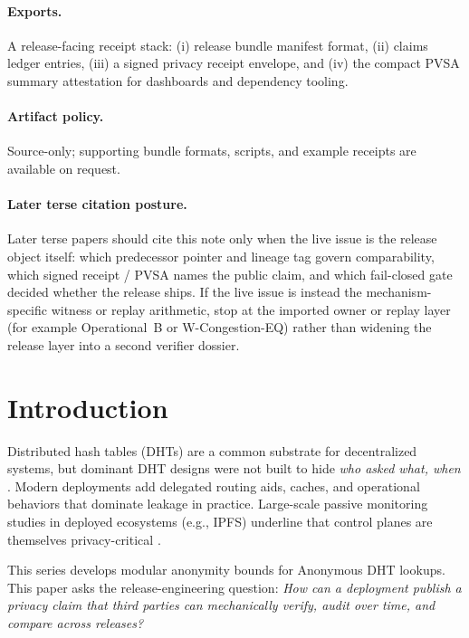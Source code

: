 \documentclass[11pt]{article}
\begin{document}
\paragraph{Exports.}
A release-facing receipt stack: (i) release bundle manifest format, (ii) claims ledger entries,
(iii) a signed privacy receipt envelope, and (iv) the compact PVSA summary attestation for dashboards and dependency tooling.

\paragraph{Artifact policy.}
Source-only; supporting bundle formats, scripts, and example receipts are available on request.\cite{series:artifactpolicy}

\paragraph{Later terse citation posture.} Later terse papers should cite this note only when the live issue is the release object itself: which predecessor pointer and lineage tag govern comparability, which signed receipt / PVSA names the public claim, and which fail-closed gate decided whether the release ships. If the live issue is instead the mechanism-specific witness or replay arithmetic, stop at the imported owner or replay layer (for example Operational~B or W-Congestion-EQ) rather than widening the release layer into a second verifier dossier.\cite{series:proofcarryingbudgets,series:wcongeq}

\section{Introduction}
Distributed hash tables (DHTs) are a common substrate for decentralized systems, but dominant DHT designs were not built to hide \emph{who asked what, when} \cite{kademlia2002}.
Modern deployments add delegated routing aids, caches, and operational behaviors that dominate leakage in practice.
Large-scale passive monitoring studies in deployed ecosystems (e.g., IPFS) underline that control planes are themselves privacy-critical \cite{balduf_ipfs_monitoring}.

This series develops modular anonymity bounds for Anonymous DHT lookups.
This paper asks the release-engineering question:
\emph{How can a deployment publish a privacy claim that third parties can mechanically verify, audit over time, and compare across releases?}
\end{document}
